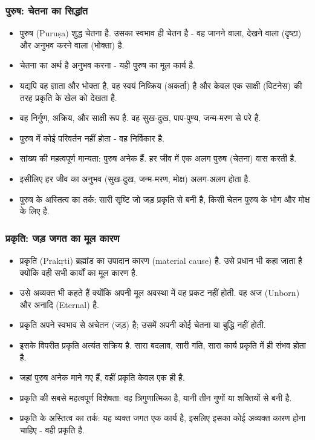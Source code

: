 \begin{frame}[fragile]\frametitle{पुरुष: चेतना का सिद्धांत}
      \begin{itemize}
	\item पुरुष (Puruṣa) शुद्ध चेतना है. उसका स्वभाव ही चेतन है - वह जानने वाला, देखने वाला (दृष्टा) और अनुभव करने वाला (भोक्ता) है.
    \item चेतना का अर्थ है अनुभव करना - यही पुरुष का मूल कार्य है.
	\item यद्यपि वह ज्ञाता और भोक्ता है, वह स्वयं निष्क्रिय (अकर्ता) है और केवल एक साक्षी (विटनेस) की तरह प्रकृति के खेल को देखता है.
	\item वह निर्गुण, अक्रिय, और साक्षी रूप है. वह सुख-दुख, पाप-पुण्य, जन्म-मरण से परे है.
	\item पुरुष में कोई परिवर्तन नहीं होता - वह निर्विकार है.
	\item सांख्य की महत्वपूर्ण मान्यता: पुरुष अनेक हैं. हर जीव में एक अलग पुरुष (चेतना) वास करती है.
    \item इसीलिए हर जीव का अनुभव (सुख-दुख, जन्म-मरण, मोक्ष) अलग-अलग होता है.
    \item पुरुष के अस्तित्व का तर्क: सारी सृष्टि जो जड़ प्रकृति से बनी है, किसी चेतन पुरुष के भोग और मोक्ष के लिए है.
	  \end{itemize}
\end{frame}

\begin{frame}[fragile]\frametitle{प्रकृति: जड़ जगत का मूल कारण}
      \begin{itemize}
	\item प्रकृति (Prakṛti) ब्रह्मांड का उपादान कारण (material cause) है. उसे प्रधान भी कहा जाता है क्योंकि वही सभी कार्यों का मूल कारण है.
    \item उसे अव्यक्त भी कहते हैं क्योंकि अपनी मूल अवस्था में वह प्रकट नहीं होती. वह अज (Unborn) और अनादि (Eternal) है.
	\item प्रकृति अपने स्वभाव से अचेतन (जड़) है; उसमें अपनी कोई चेतना या बुद्धि नहीं होती.
	\item इसके विपरीत प्रकृति अत्यंत सक्रिय है. सारा बदलाव, सारी गति, सारा कार्य प्रकृति में ही संभव होता है.
	\item जहां पुरुष अनेक माने गए हैं, वहीं प्रकृति केवल एक ही है.
	\item प्रकृति की सबसे महत्वपूर्ण विशेषता: वह त्रिगुणात्मिका है, यानी तीन गुणों या शक्तियों से बनी है.
    \item प्रकृति के अस्तित्व का तर्क: यह व्यक्त जगत एक कार्य है, इसलिए इसका कोई अव्यक्त कारण होना चाहिए - वही प्रकृति है.
	  \end{itemize}
\end{frame}


